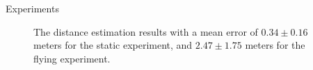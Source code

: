 \documentclass{beamer}
\begin{document}

\begin{frame}{Experiments}

\begin{figure}[H]
	\centering
	\caption{
            The distance estimation results with a mean error of
            $0.34 \pm 0.16$ meters for the static experiment, and
            $2.47 \pm 1.75$ meters for the flying experiment.
        }
	\label{fig:experiment_results}
\end{figure}

\end{frame}
\end{document}
